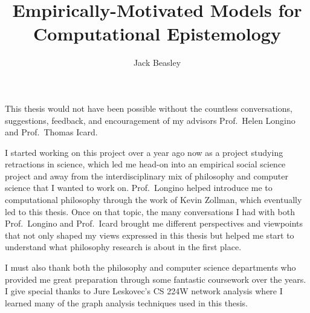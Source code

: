 \documentclass{report}
\begin{document}
\title{Empirically-Motivated Models for Computational Epistemology}
\author{Jack Beasley}
 
\beforepreface
{}

This thesis would not have been possible without the countless
conversations, suggestions, feedback, and encouragement of my advisors
Prof.~Helen Longino and Prof.~Thomas Icard.

I started working on this project over a year ago now as a project
studying retractions in science, which led me head-on into an empirical
social science project and away from the interdisciplinary mix of
philosophy and computer science that I wanted to work on. Prof.~Longino
helped introduce me to computational philosophy through the work of
Kevin Zollman, which eventually led to this thesis. Once on that topic,
the many conversations I had with both Prof.~Longino and Prof.~Icard
brought me different perspectives and viewpoints that not only shaped my
views expressed in this thesis but helped me start to understand what
philosophy research is about in the first place.

I must also thank both the philosophy and computer science departments
who provided me great preparation through some fantastic coursework over
the years. I give special thanks to Jure Leskovec's CS 224W network
analysis where I learned many of the graph analysis techniques used in
this thesis.

\afterpreface















\appendix



\printbibliography
\end{document}
